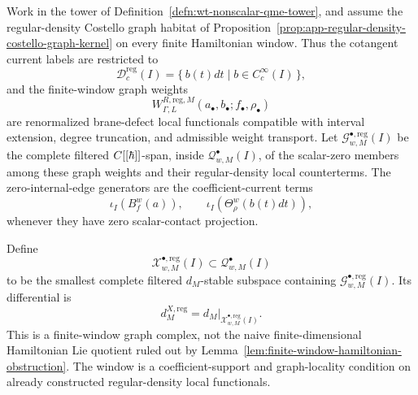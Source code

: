 \begin{defn}
\label{defn:wt-regular-density-closed-exchange-complex}
  Work in the tower of
  Definition~\ref{defn:wt-nonscalar-qme-tower}, and assume the
  regular-density Costello graph habitat of
  Proposition~\ref{prop:app-regular-density-costello-graph-kernel} on
  every finite Hamiltonian window.  Thus the cotangent current labels are
  restricted to
  \[
    \mathcal D^{\mathrm{reg}}_c(I)
      =\{\,b(t)dt\mid b\in C^\infty_c(I)\,\},
  \]
  and the finite-window graph weights
  \[
    W^{R,\mathrm{reg},M}_{\Gamma,L}
      (a_\bullet,b_\bullet;f_\bullet,\rho_\bullet)
  \]
  are renormalized brane-defect local functionals compatible with
  interval extension, degree truncation, and admissible weight transport.
  Let \(\mathcal G^{\bullet,\mathrm{reg}}_{w,M}(I)\) be the complete
  filtered \(C[[\hbar]]\)-span, inside
  \(\mathcal Q^\bullet_{w,M}(I)\), of the scalar-zero members among these
  graph weights and their regular-density local counterterms.  The
  zero-internal-edge generators are the coefficient-current terms
  \[
    \iota_I(B^w_f(a)),\qquad
    \iota_I(\Theta^w_\rho(b(t)dt)),
  \]
  whenever they have zero scalar-contact projection.

  Define
  \[
    \mathcal X^{\bullet,\mathrm{reg}}_{w,M}(I)
      \subset \mathcal Q^\bullet_{w,M}(I)
  \]
  to be the smallest complete filtered \(d_M\)-stable subspace containing
  \(\mathcal G^{\bullet,\mathrm{reg}}_{w,M}(I)\).  Its differential is
  \[
    d^{X,\mathrm{reg}}_M=d_M|_{\mathcal X^{\bullet,\mathrm{reg}}_{w,M}(I)}.
  \]
  This is a finite-window graph complex, not the naive finite-dimensional
  Hamiltonian Lie quotient ruled out by
  Lemma~\ref{lem:finite-window-hamiltonian-obstruction}.  The window is a
  coefficient-support and graph-locality condition on already constructed
  regular-density local functionals.
\end{defn}

